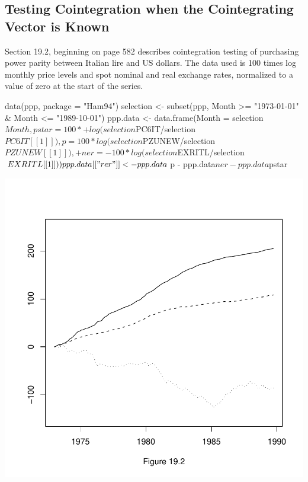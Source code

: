 \documentclass[a4paper]{article}
\renewcommand{\~}{\perispomeni}%
\begin{document}
\subsection{Testing Cointegration when the Cointegrating Vector is Known}
Section 19.2, beginning on page 582 describes cointegration testing of purchasing power parity between
Italian lire and US dollars.  The data used is 100 times log monthly price levels and spot nominal and real
exchange rates, normalized to a value of zero at the start of the series.  
\begin{Schunk}
\begin{Sinput}
 data(ppp, package = "Ham94")
 selection <- subset(ppp, Month >= "1973-01-01" & Month <= "1989-10-01")
 ppp.data <- data.frame(Month = selection$Month, pstar = 100 * 
+     log(selection$PC6IT/selection$PC6IT[[1]]), p = 100 * log(selection$PZUNEW/selection$PZUNEW[[1]]), 
+     ner = -100 * log(selection$EXRITL/selection$EXRITL[[1]]))
 ppp.data[["rer"]] <- ppp.data$p - ppp.data$ner - ppp.data$pstar
\end{Sinput}
\end{Schunk}
\begin{center}
\includegraphics{Companion-066}
\end{center}
\end{document}
